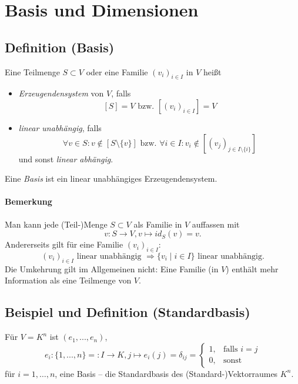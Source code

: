 \section{Basis und Dimensionen}

\subsection{Definition (Basis)}
	\begin{Definition}[Basis]
		Eine Teilmenge $S\subset V$ oder eine Familie $(v_i)_{i\in I}$ in $ V $ heißt
	\begin{itemize}
		\item \emph{Erzeugendensystem} von $ V $, falls \[[S] = V \text{ bzw. } [(v_i)_{i\in I}] = V\]
		\item \emph{linear unabhängig}, falls \[\forall v\in S: v \notin [S\setminus\{{v\}}] \text{ bzw. } \forall i\in I: v_i \notin [(v_j)_{j\in I\setminus\{{i\}}}]\] und sonst \emph{linear abhängig}.
	\end{itemize}
        Eine \emph{Basis} ist ein linear unabhängiges Erzeugendensystem.
	\end{Definition}

\paragraph{Bemerkung}
	Man kann jede (Teil-)Menge $S\subset V$ als Familie in $V$ auffassen mit
		\[v: S \to V, v\mapsto id_S(v) = v.\]
	Andererseits gilt für eine Familie $(v_i)_{i\in I} $:
		\[(v_i)_{i\in I} \text{ linear unabhängig } \Rightarrow \{v_i \mid i\in I\} \text{ linear unabhängig.}\]
	Die Umkehrung gilt im Allgemeinen nicht: Eine Familie (in $ V $) enthält mehr Information als eine Teilmenge von $ V $.
	
\subsection{Beispiel und Definition (Standardbasis)}
	\begin{Definition}[Standardbasis]
		Für $V = K^n$ ist $(e_1, ... , e_n)$,
	\begin{equation*}
		e_i:\{{1, ... ,n\}} =: I\to K, j\mapsto e_i(j)= \delta_{ij}=
		\begin{cases}
			1,& \text{falls } i=j\\
			0,& \text{sonst}
		\end{cases}
	\end{equation*}
	für $i=1,\dots,n$, eine Basis -- die Standardbasis des (Standard-)Vektorraumes $K^n$.
	\end{Definition}

